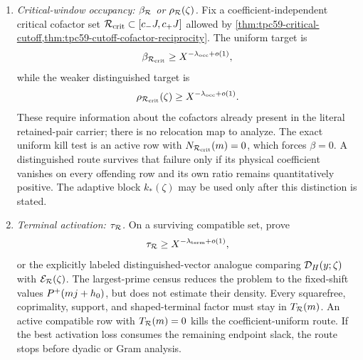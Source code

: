 \begin{enumerate}[label=\textbf{Door \Alph*.},leftmargin=3.8em]
 \item \emph{Critical-window occupancy: \(\beta_{\mathcal R}\) or
       \(\rho_{\mathcal R}(\zeta)\).}
       Fix a coefficient-independent critical cofactor set
       \(\mathcal R_{\rm crit}\subset[c_-J,c_+J]\) allowed by
       \cref{thm:tpc59-critical-cutoff,thm:tpc59-cutoff-cofactor-reciprocity}.
       The uniform target is
       \begin{equation}
        \beta_{\mathcal R_{\rm crit}}
        \ge X^{-\lambda_{\rm occ}+o(1)},
        \label{eq:tpc59-next-uniform-occupancy}
       \end{equation}
       while the weaker distinguished target is
       \begin{equation}
        \rho_{\mathcal R_{\rm crit}}(\zeta)
        \ge X^{-\lambda_{\rm occ}+o(1)}.
        \label{eq:tpc59-next-distinguished-occupancy}
       \end{equation}
       These require information about the cofactors already present in the
       literal retained-pair carrier; there is no relocation map to analyze.
       The exact uniform kill test is an active row with
       \(N_{\mathcal R_{\rm crit}}(m)=0\), which forces \(\beta=0\).  A
       distinguished route survives that failure only if its physical
       coefficient vanishes on every offending row and its own ratio remains
       quantitatively positive.  The adaptive block \(k_*(\zeta)\) may be
       used only after this distinction is stated.

 \item \emph{Terminal activation: \(\tau_{\mathcal R}\).}
       On a surviving compatible set, prove
       \begin{equation}
        \tau_{\mathcal R}
        \ge X^{-\lambda_{\rm term}+o(1)},
        \label{eq:tpc59-next-terminal-activation}
       \end{equation}
       or the explicitly labeled distinguished-vector analogue comparing
       \(\mathcal D_H(y;\zeta)\) with \(\mathcal E_{\mathcal R}(\zeta)\).  The largest-prime
       census reduces the problem to the fixed-shift values
       \(P^{+}(mj+h_0)\), but does not estimate their density.  Every
       squarefree, coprimality, support, and shaped-terminal factor must stay
       in \(T_{\mathcal R}(m)\).  An active compatible row with
       \(T_{\mathcal R}(m)=0\) kills the coefficient-uniform route.  If the best
       activation loss consumes the remaining endpoint slack, the route
       stops before dyadic or Gram analysis.


\end{enumerate}
